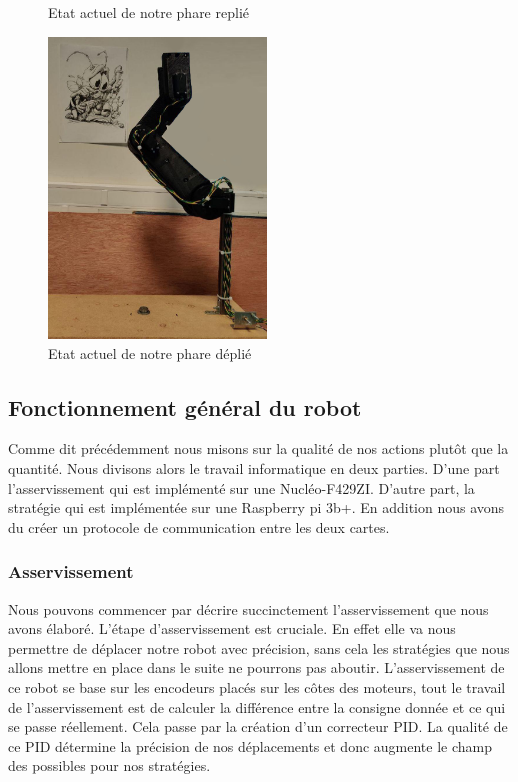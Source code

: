 \documentclass[a4paper,10pt]{article}
\begin{document}
\begin{spacing}{1.5}
\begin{multicols}{2}
\begin{figure}[H]
  \caption{Etat actuel de notre phare replié}
\end{figure}
\columnbreak
\begin{figure}[H]
  \center
  \includegraphics[scale=0.3, height=8cm]{phare_d.png}
  \caption{Etat actuel de notre phare déplié}
\end{figure}
\end{multicols}
\subsection{Fonctionnement général du robot}
Comme dit précédemment nous misons sur la qualité de nos actions plutôt que la
quantité. Nous divisons alors le travail informatique en deux parties. D'une
part l'asservissement qui est implémenté sur une Nucléo-F429ZI. D'autre part, la
stratégie qui est implémentée sur une Raspberry pi 3b+. En addition nous avons du
créer un protocole de communication entre les deux cartes.\\

\subsubsection{Asservissement}
Nous pouvons commencer par décrire succinctement l'asservissement que nous avons
élaboré. L'étape d'asservissement est cruciale. En effet elle va nous permettre
de déplacer notre robot avec précision, sans cela les stratégies que nous allons
mettre en place dans le suite ne pourrons pas aboutir. L'asservissement de ce
robot se base sur les encodeurs placés sur les côtes des moteurs, tout le travail de
l'asservissement est de calculer la différence entre la consigne donnée et ce
qui se passe réellement. Cela passe par la création d'un correcteur PID. La
qualité de ce PID détermine la précision de nos déplacements et donc augmente le
champ des possibles pour nos stratégies.


\end{spacing}
\end{document}
